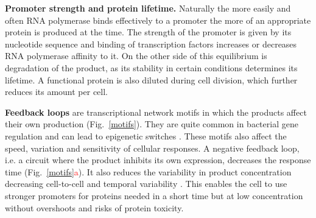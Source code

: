 \textbf{Promoter strength and protein lifetime.}
Naturally the more easily and often RNA polymerase binds effectively to a promoter the more of an appropriate protein is produced at the time.
The strength of the promoter is given by its nucleotide sequence and binding of transcription factors increases or decreases RNA polymerase affinity to it.
On the other side of this equilibrium is degradation of the product, as its stability in certain conditions determines its lifetime.
A functional protein is also diluted during cell division, which further reduces its amount per cell.

\textbf{Feedback loops} are transcriptional network motifs in which the products affect their own production  (Fig.~\ref{motifs}).
They are quite common in bacterial gene regulation and can lead to epigenetic switches \cite{smits2006phenotypic, veening2008bistability}.
These motifs also affect the speed, variation and sensitivity of cellular responses.
A negative feedback loop, i.e. a circuit where the product inhibits its own expression, decreases the response time \cite{rosenfeld2002negative} (Fig.~\ref{motifs}\textcolor{red}{a}).
It also reduces the variability in product concentration decreasing cell-to-cell and temporal variability \cite{becskei2000engineering}.
This enables the cell to use stronger promoters for proteins needed in a short time but at low concentration without overshoots and risks of protein toxicity.

